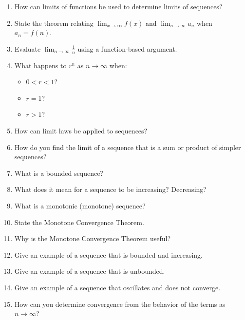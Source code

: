 \begin{enumerate}
\item How can limits of functions be used to determine limits of sequences?

\item State the theorem relating $\lim_{x\to\infty} f(x)$ and $\lim_{n\to\infty} a_n$ when $a_n = f(n)$.

\item Evaluate $\lim_{n\to\infty} \frac{1}{n}$ using a function-based argument.

\item What happens to $r^n$ as $n \to \infty$ when:
  \begin{itemize}
    \item $0 < r < 1$?
    \item $r = 1$?
    \item $r > 1$?
  \end{itemize}

\item How can limit laws be applied to sequences?

\item How do you find the limit of a sequence that is a sum or product of simpler sequences?

\item What is a bounded sequence?

\item What does it mean for a sequence to be increasing? Decreasing?

\item What is a monotonic (monotone) sequence?

\item State the Monotone Convergence Theorem.

\item Why is the Monotone Convergence Theorem useful?

\item Give an example of a sequence that is bounded and increasing.

\item Give an example of a sequence that is unbounded.

\item Give an example of a sequence that oscillates and does not converge.

\item How can you determine convergence from the behavior of the terms as $n \to \infty$?

\end{enumerate}
